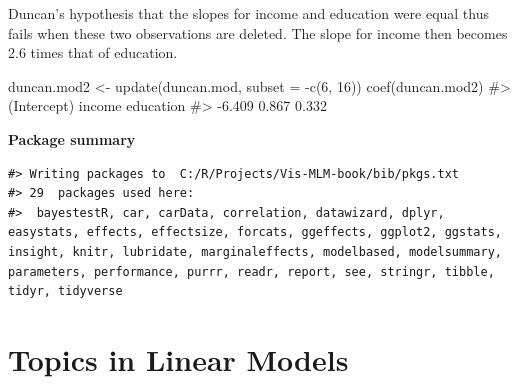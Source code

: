 \documentclass[
  letterpaper,
  10pt,
  krantz2]{krantz}
\makeatletter
\newenvironment{Shaded}{\begin{snugshade}}{\end{snugshade}}
\newcommand{\AttributeTok}[1]{\textcolor[rgb]{0.40,0.45,0.13}{#1}}
\newcommand{\CommentTok}[1]{\textcolor[rgb]{0.37,0.37,0.37}{#1}}
\newcommand{\DecValTok}[1]{\textcolor[rgb]{0.68,0.00,0.00}{#1}}
\newcommand{\FunctionTok}[1]{\textcolor[rgb]{0.28,0.35,0.67}{#1}}
\newcommand{\NormalTok}[1]{\textcolor[rgb]{0.00,0.23,0.31}{#1}}
\newcommand{\OtherTok}[1]{\textcolor[rgb]{0.00,0.23,0.31}{#1}}
\newcommand{\SpecialCharTok}[1]{\textcolor[rgb]{0.37,0.37,0.37}{#1}}
\newenvironment{kframe}{%
  \medskip{}
  \setlength{\fboxsep}{.8em}
  \def\at@end@of@kframe{}%
  \ifinner\ifhmode%
  \def\at@end@of@kframe{\end{minipage}}%
  \begin{minipage}{\columnwidth}%
  \fi\fi%
  \def\FrameCommand##1{\hskip\@totalleftmargin \hskip-\fboxsep
  \colorbox{shadecolor}{##1}\hskip-\fboxsep
      \hskip-\linewidth \hskip-\@totalleftmargin \hskip\columnwidth}%
  \MakeFramed {\advance\hsize-\width
    \@totalleftmargin\z@ \linewidth\hsize
    \@setminipage}}%
{\par\unskip\endMakeFramed%
  \at@end@of@kframe}
\renewenvironment{Shaded}{\begin{kframe}}{\end{kframe}}
\makeatother
\begin{document}
Duncan's hypothesis that the slopes for income and education were equal
thus fails when these two observations are deleted. The slope for income
then becomes 2.6 times that of education.

\begin{Shaded}
\begin{Highlighting}[]
\NormalTok{duncan.mod2 }\OtherTok{\textless{}{-}} \FunctionTok{update}\NormalTok{(duncan.mod, }\AttributeTok{subset =} \SpecialCharTok{{-}}\FunctionTok{c}\NormalTok{(}\DecValTok{6}\NormalTok{, }\DecValTok{16}\NormalTok{))}
\FunctionTok{coef}\NormalTok{(duncan.mod2)}
\CommentTok{\#\textgreater{} (Intercept)      income   education }
\CommentTok{\#\textgreater{}      {-}6.409       0.867       0.332}
\end{Highlighting}
\end{Shaded}

\textbf{Package summary}

\begin{verbatim}
#> Writing packages to  C:/R/Projects/Vis-MLM-book/bib/pkgs.txt
#> 29  packages used here:
#>  bayestestR, car, carData, correlation, datawizard, dplyr, easystats, effects, effectsize, forcats, ggeffects, ggplot2, ggstats, insight, knitr, lubridate, marginaleffects, modelbased, modelsummary, parameters, performance, purrr, readr, report, see, stringr, tibble, tidyr, tidyverse
\end{verbatim}


\chapter{Topics in Linear Models}\label{topics-in-linear-models}

\renewcommand*{\vec}[1]{\mathbf{#1}}
\newcommand{\trans}{^\mathsf{T}}
\newcommand*{\mat}[1]{\mathbf{#1}}
\newcommand*{\diag}[1]{\mathrm{diag}\, #1}

\renewcommand*{\det}[1]{\mathrm{det}(#1)}
\newcommand*{\rank}[1]{\mathrm{rank} (\mathbf{#1})}
\newcommand*{\trace}[1]{\mathrm{tr} (\mathbf{#1})}
\newcommand*{\dev}[1]{(#1 - \bar{#1})}
\newcommand*{\inv}[1]{\mat{#1}^{-1}}
\newcommand*{\half}[1]{\mat{#1}^{1/2}}
\newcommand*{\invhalf}[1]{\mat{#1}^{-1/2}}
\newcommand*{\nvec}[2]{{#1}_{1}, {#1}_{2},\ldots,{#1}_{#2}}
\newcommand*{\Beta}{\boldsymbol{B}}
\newcommand*{\Epsilon}{\boldsymbol{\Large\varepsilon}}
\newcommand*{\period}{\:\: .}
\newcommand*{\comma}{\:\: ,}
\newcommand*{\given}{\, | \,}
\newcommand*{\Real}[1]{\mathbb{R}^{#1}}
\newcommand*{\degree}[1]{{#1}^{\circ}}
\end{document}
